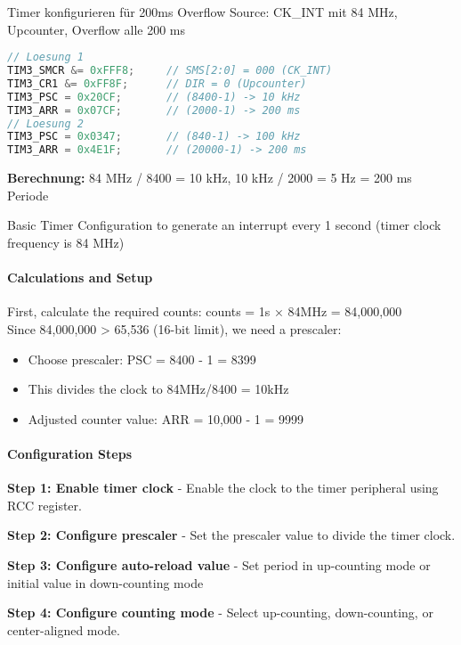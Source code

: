 \begin{example2}{Timer konfigurieren für 200ms Overflow}
    Source: CK\_INT mit 84 MHz, Upcounter, Overflow alle 200 ms
\begin{lstlisting}[language=C, style=basesmol]
// Loesung 1
TIM3_SMCR &= 0xFFF8;     // SMS[2:0] = 000 (CK_INT)
TIM3_CR1 &= 0xFF8F;      // DIR = 0 (Upcounter)
TIM3_PSC = 0x20CF;       // (8400-1) -> 10 kHz
TIM3_ARR = 0x07CF;       // (2000-1) -> 200 ms
// Loesung 2
TIM3_PSC = 0x0347;       // (840-1) -> 100 kHz
TIM3_ARR = 0x4E1F;       // (20000-1) -> 200 ms
\end{lstlisting}
    
    \textbf{Berechnung:}
    84 MHz / 8400 = 10 kHz, 10 kHz / 2000 = 5 Hz = 200 ms Periode
\end{example2}


\begin{example2}{Basic Timer Configuration} to generate an interrupt every 1 second (timer clock frequency is 84 MHz)
\paragraph{Calculations and Setup}
First, calculate the required counts: counts = 1s × 84MHz = 84,000,000
\vspace{1mm}\\
Since 84,000,000 > 65,536 (16-bit limit), we need a prescaler:
\begin{itemize}
    \item Choose prescaler: PSC = 8400 - 1 = 8399
    \item This divides the clock to 84MHz/8400 = 10kHz
    \item Adjusted counter value: ARR = 10,000 - 1 = 9999
\end{itemize}

\paragraph{Configuration Steps}
\textbf{Step 1: Enable timer clock} -
Enable the clock to the timer peripheral using RCC register.

\textbf{Step 2: Configure prescaler} -
Set the prescaler value to divide the timer clock.

\textbf{Step 3: Configure auto-reload value} -
Set period in up-counting mode or initial value in down-counting mode

\textbf{Step 4: Configure counting mode} -
Select up-counting, down-counting, or center-aligned mode.


\end{example2}
